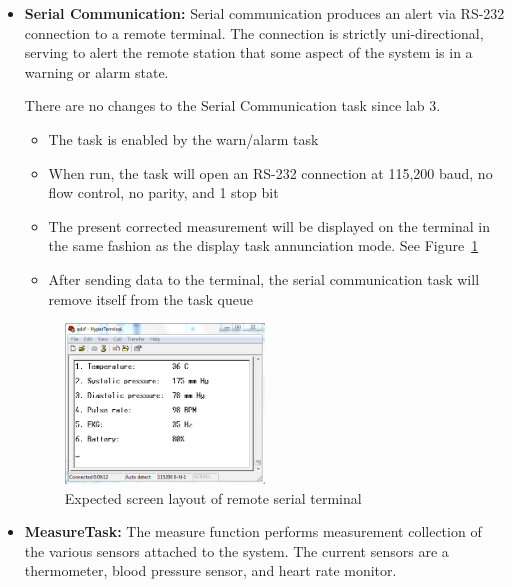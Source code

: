 \documentclass[12pt]{article} %
\begin{document}
\begin{itemize}
	\item \textbf{Serial Communication:}
		Serial communication produces an alert via RS-232 connection to a remote
		terminal. The connection is strictly uni-directional, serving to alert the
		remote station that some aspect of the system is in a warning or alarm
		state.

		There are no changes to the Serial Communication task since lab 3.
    \begin{itemize}
      \item The task is enabled by the warn/alarm task
      \item When run, the task will open an RS-232 connection at 115,200 baud,
          no flow control, no parity, and 1 stop bit
      \item The present corrected measurement will be displayed on the terminal
				in the same fashion as the display task annunciation mode. See Figure~\ref{fig:serial_display}
      \item After sending data to the terminal, the serial communication task
	will remove itself from the task queue
    \end{itemize}

		\begin{figure}[h]
			\centering
			\includegraphics[width=0.5\textwidth]{../design/Serial_screen1.png}
			\caption{Expected screen layout of remote serial terminal}
			\label{fig:serial_display}
		\end{figure}

	\item \textbf{MeasureTask:}
		The measure function performs measurement collection of the various sensors
		attached to the system. The current sensors are a thermometer, blood
		pressure sensor, and heart rate monitor.
		

\end{itemize}
\end{document}
